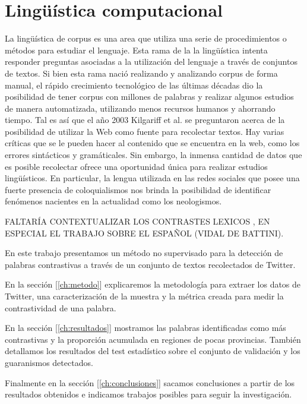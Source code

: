 \section{Lingüística computacional} %
\label{linguistica_computacional}

La lingüística de corpus es una area que utiliza una serie de procedimientos o métodos para estudiar el lenguaje. Esta rama de la la lingüística intenta responder 
preguntas asociadas a la utilización del lenguaje a través de conjuntos de textos. Si bien esta rama nació realizando y analizando corpus de forma manual, el rápido crecimiento
tecnológico de las últimas décadas dio la posibilidad de tener corpus con millones de palabras y realizar algunos estudios de manera automatizada, utilizando menos recursos humanos y ahorrando tiempo. 
Tal es así que el año 2003 Kilgariff et al. \cite{kilgarriff2003introduction} se preguntaron acerca de la posibilidad de utilizar la Web como fuente para recolectar textos. Hay varias críticas que se le pueden hacer al contenido que se encuentra en la web, como los errores sintácticos y  gramáticales. Sin embargo, la inmensa cantidad de datos que es posible recolectar ofrece una oportunidad única para realizar estudios lingüísticos. En particular, la lengua utilizada en las redes sociales que posee una fuerte presencia de coloquialismos nos brinda la posibilidad de identificar fenómenos nacientes en la actualidad como los neologismos.

FALTARÍA CONTEXTUALIZAR LOS CONTRASTES LEXICOS , EN ESPECIAL EL TRABAJO SOBRE EL ESPAÑOL (VIDAL DE BATTINI).

\cite{baayen2001word}
\cite{mcenery2011corpus}


En este trabajo presentamos un método no supervisado para la detección de palabras contrastivas a través de un conjunto de textos recolectados de Twitter.

En la sección [\ref{ch:metodo}]
explicaremos la metodología para extraer los datos de Twitter, una caracterización de la muestra y la métrica creada para medir la contrastividad de una palabra.

En la sección [\ref{ch:resultados}] mostramos las palabras identificadas como más contrastivas y la proporción acumulada en regiones de pocas provincias. También detallamos los resultados del test estadístico sobre el conjunto de validación y los guaranismos detectados. 

Finalmente en la sección [\ref{ch:conclusiones}] sacamos conclusiones a partir de los resultados obtenidos e indicamos trabajos posibles para seguir la investigación.